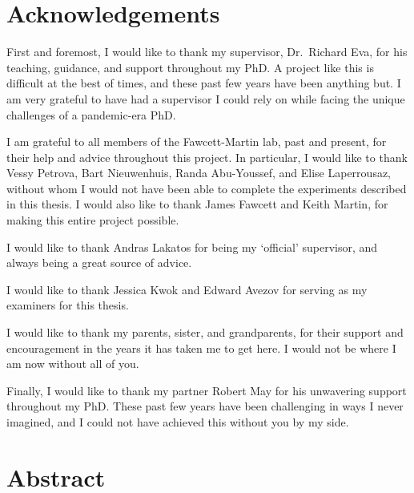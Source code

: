 \documentclass[
  12pt,
  a4paper,
]{book}
\begin{document}
\hypertarget{ACKNOWLEDGEMENTS}{%
\chapter*{Acknowledgements}\label{ACKNOWLEDGEMENTS}}


First and foremost, I would like to thank my supervisor, Dr.~Richard Eva, for his teaching, guidance, and support throughout my PhD. A project like this is difficult at the best of times, and these past few years have been anything but. I am very grateful to have had a supervisor I could rely on while facing the unique challenges of a pandemic-era PhD.

I am grateful to all members of the Fawcett-Martin lab, past and present, for their help and advice throughout this project. In particular, I would like to thank Vessy Petrova, Bart Nieuwenhuis, Randa Abu-Youssef, and Elise Laperrousaz, without whom I would not have been able to complete the experiments described in this thesis. I would also like to thank James Fawcett and Keith Martin, for making this entire project possible.

I would like to thank Andras Lakatos for being my `official' supervisor, and always being a great source of advice.

I would like to thank Jessica Kwok and Edward Avezov for serving as my examiners for this thesis.

I would like to thank my parents, sister, and grandparents, for their support and encouragement in the years it has taken me to get here. I would not be where I am now without all of you.

Finally, I would like to thank my partner Robert May for his unwavering support throughout my PhD. These past few years have been challenging in ways I never imagined, and I could not have achieved this without you by my side.

\hypertarget{ABSTRACT}{%
\chapter*{Abstract}\label{ABSTRACT}}

\end{document}
